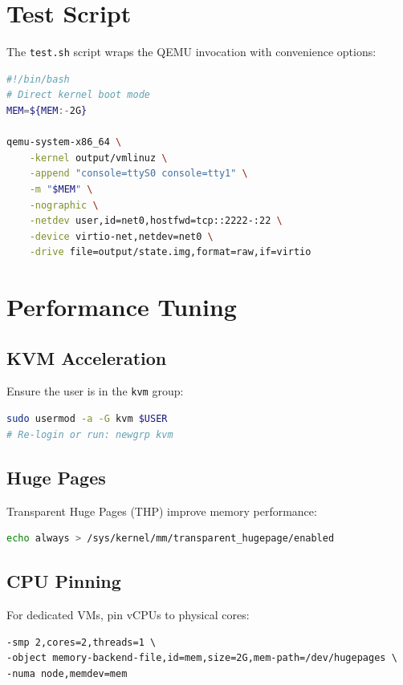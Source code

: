 \section{Test Script}

The \texttt{test.sh} script wraps the QEMU invocation with convenience
options:

\begin{lstlisting}[language=bash]
#!/bin/bash
# Direct kernel boot mode
MEM=${MEM:-2G}

qemu-system-x86_64 \
    -kernel output/vmlinuz \
    -append "console=ttyS0 console=tty1" \
    -m "$MEM" \
    -nographic \
    -netdev user,id=net0,hostfwd=tcp::2222-:22 \
    -device virtio-net,netdev=net0 \
    -drive file=output/state.img,format=raw,if=virtio
\end{lstlisting}

\section{Performance Tuning}

\subsection{KVM Acceleration}

Ensure the user is in the \texttt{kvm} group:
\begin{lstlisting}[language=bash]
sudo usermod -a -G kvm $USER
# Re-login or run: newgrp kvm
\end{lstlisting}

\subsection{Huge Pages}

Transparent Huge Pages (THP) improve memory performance:
\begin{lstlisting}[language=bash]
echo always > /sys/kernel/mm/transparent_hugepage/enabled
\end{lstlisting}

\subsection{CPU Pinning}

For dedicated VMs, pin vCPUs to physical cores:
\begin{lstlisting}
-smp 2,cores=2,threads=1 \
-object memory-backend-file,id=mem,size=2G,mem-path=/dev/hugepages \
-numa node,memdev=mem
\end{lstlisting}

